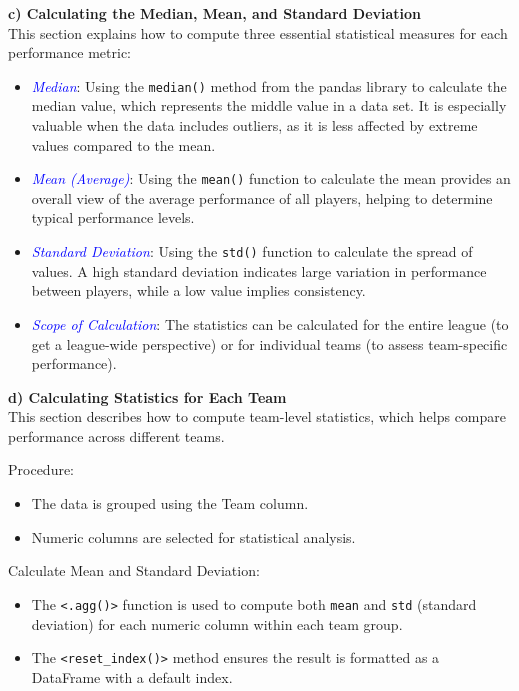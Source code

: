\documentclass[a4paper,12pt]{article}
\begin{document}
\textbf{c) Calculating the Median, Mean, and Standard Deviation} \\
This section explains how to compute three essential statistical measures for each performance metric:
\begin{itemize}
    \item \textit{\textcolor{blue}{Median}}: Using the \texttt{median()} method from the pandas library to calculate the median value, which represents the middle value in a data set. It is especially valuable when the data includes outliers, as it is less affected by extreme values compared to the mean.
    \item \textit{\textcolor{blue}{Mean (Average)}}: Using the \texttt{mean()} function to calculate the mean provides an overall view of the average performance of all players, helping to determine typical performance levels.
    \item \textit{\textcolor{blue}{Standard Deviation}}: Using the \texttt{std()} function to calculate the spread of values. A high standard deviation indicates large variation in performance between players, while a low value implies consistency.
    \item \textit{\textcolor{blue}{Scope of Calculation}}: The statistics can be calculated for the entire league (to get a league-wide perspective) or for individual teams (to assess team-specific performance).
\end{itemize}

\textbf{d) Calculating Statistics for Each Team} \\
This section describes how to compute team-level statistics, which helps compare performance across different teams.

Procedure:
\begin{itemize}
    \item The data is grouped using the Team column.
    \item Numeric columns are selected for statistical analysis.
\end{itemize}

Calculate Mean and Standard Deviation:
\begin{itemize}
    \item The \texttt{<.agg()>} function is used to compute both \texttt{mean} and \texttt{std} (standard deviation) for each numeric column within each team group.
    \item The \texttt{<reset\_index()>} method ensures the result is formatted as a DataFrame with a default index.
\end{itemize}
\end{document}
